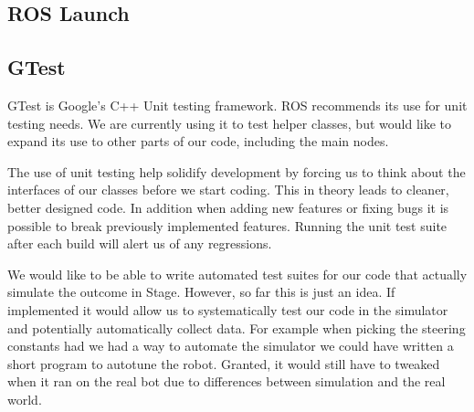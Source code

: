 \subsection{ROS Launch}



\subsection{GTest}

GTest is Google's C++ Unit testing
framework.\cite{google_googletest} ROS recommends
its use for unit testing needs.  We are currently using it to test
helper classes, but would like to expand its use to other parts of our
code, including the main nodes.

The use of unit testing help solidify development by forcing us to
think about the interfaces of our classes before we start coding.
This in theory leads to cleaner, better designed code.  In addition
when adding new features or fixing bugs it is possible to break
previously implemented features.  Running the unit test suite after
each build will alert us of any regressions.

We would like to be able to write automated test suites for our code
that actually simulate the outcome in Stage. However, so far this is
just an idea.  If implemented it would allow us to systematically test
our code in the simulator and potentially automatically collect data.
For example when picking the steering constants had we had a way to
automate the simulator we could have written a short program to
autotune the robot.  Granted, it would still have to tweaked when it
ran on the real bot due to differences between simulation and the real world.